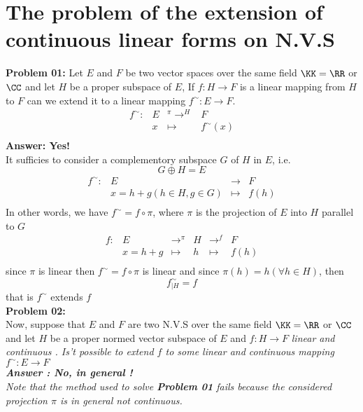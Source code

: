 \section{The problem of the extension of continuous linear forms on N.V.S}  
\textbf{Problem 01: } 
Let $E $ and $F $ be two vector spaces over the same field $\KK = \RR  $  or
$\CC$ and let $H $ be a proper subspace of $E$, If 
$ f : H \longrightarrow F $ is a linear mapping from $H $ to $F $ can we extend
it to a linear mapping $ f^{\sim} : E \longrightarrow F$.
\[
\begin{array}{cccc}
      f^{\sim} : &  E  & ^{\pi }\longrightarrow^{H}& F \\

           &    x & \longmapsto     &  f^{\sim}(x) \\ 
\end{array}
\]
\textbf{Answer: Yes!}\\
It sufficies to consider a complementory subspace $G $ of $H $ in $E $, i.e. 
\[
G \oplus H = E
\]
\[
\begin{array}{cccc}
      f^{\sim} : &  E  & \longrightarrow & F \\

           &  x = h+g (h \in  H, g \in  G)  & \longmapsto     & f(h)  \\ 
\end{array}
\]
In other words, we have 
$f^{\sim} = f \circ \pi  $, where $\pi  $ is the projection of $E $ 
into $H $ parallel to $G$  
\[
\begin{array}{cccccc}
	f : &  E  & \longrightarrow^{\pi } & H & \longrightarrow^{f} & F \\

	    &   x=h+g & \longmapsto     & h & \longmapsto & f(h)  \\ 
\end{array}
\]
since $\pi$ is linear then $f^{\sim} = f \circ \pi $  is linear 
and since $\pi (h)  = h (\forall  h \in  H)  $, then 
\[
f^{\sim}_{|H} = 
f 
\]
that is $f^{\sim} $  extends $f $  \\
\textbf{Problem 02: } \\
Now, suppose that $E $ and $F $ are two N.V.S over the same field $\KK = \RR  $ 
or $\CC  $  and let $H $ be a proper normed vector subspace of $E $ and 
$ f : H \longrightarrow F $ \it linear \normalfont and  \it continuous 
\normalfont. Is't possible to extend $f $ to some \it linear \normalfont and   
\it continuous \normalfont mapping 
$ f^{\sim} : E \longrightarrow F $  \\
\textbf{Answer : No, in general ! } \\
Note that the method used to solve \textbf{Problem 01} fails because
the considered projection $\pi $ is in general not continuous. 

